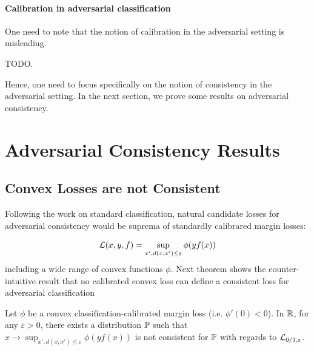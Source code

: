 \paragraph{Calibration in adversarial classification} One need to note that the notion of calibration in the adversarial setting is misleading.  

TODO.



Hence, one need to focus specifically on the notion of consistency in the adversarial setting. In the next section, we prove some results on adversarial consistency.

\section{Adversarial Consistency Results}

\subsection{Convex Losses are not Consistent}
Following the work on standard classification, natural candidate losses for adversarial consistency would be suprema of standardly calibrared margin losses:

$$\mathcal{L}(x,y,f)=\sup_{x', d(x,x')\leq\varepsilon}\phi(yf(x))$$
including a wide range of  convex functions $\phi$. Next theorem shows the counter-intuitive result that no calibrated convex loss can define a consistent loss for adversarial classification
\begin{prop}
Let $\phi$ be a convex classification-calibrated margin loss (i.e. $\phi'(0) <0$). In $\mathbb{R}$, for any $\varepsilon > 0$, there exists a distribution $\mathbb{P}$ such that $x\to\sup_{x', d(x,x')\leq\varepsilon}\phi(yf(x))$ is not consistent for $\mathbb{P}$ with regards to $\mathcal{L}_{0/1,\varepsilon}$.
\end{prop}

